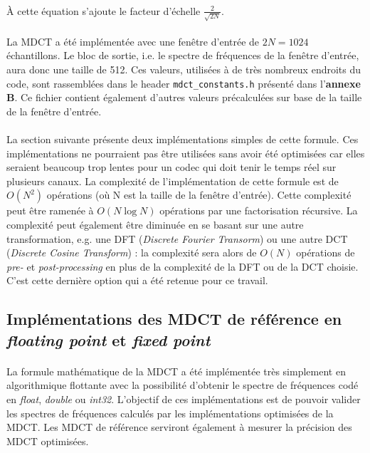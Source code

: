 \documentclass{article}
\begin{document}
    \paragraph{}
    À cette équation s'ajoute le facteur d'échelle $\frac{2}{\sqrt{2N}}$.

    \paragraph{}
    La MDCT a été implémentée avec une fenêtre d'entrée de $2N = 1024$ échantillons. Le bloc de sortie, i.e. le spectre de fréquences de la fenêtre d'entrée, aura donc une taille de 512. Ces valeurs, utilisées à de très nombreux endroits du code, sont rassemblées dans le header \texttt{mdct\_constants.h} présenté dans l'\textbf{annexe B}. Ce fichier contient également d'autres valeurs précalculées sur base de la taille de la fenêtre d'entrée.

    \paragraph{}
    La section suivante présente deux implémentations simples de cette formule. Ces implémentations ne pourraient pas être utilisées sans avoir été optimisées car elles seraient beaucoup trop lentes pour un codec qui doit tenir le temps réel sur plusieurs canaux. La complexité de l'implémentation de cette formule est de $O(N^2)$ opérations (où N est la taille de la fenêtre d'entrée). Cette complexité peut être ramenée à $O(N \log N)$ opérations par une factorisation récursive. La complexité peut également être diminuée en se basant sur une autre transformation, e.g. une DFT (\emph{Discrete Fourier Transorm}) ou une autre DCT (\emph{Discrete Cosine Transform}) : la complexité sera alors de $O(N)$ opérations de \emph{pre-} et \emph{post-processing} en plus de la complexité de la DFT ou de la DCT choisie\cite{wiki:MDCT}. C'est cette dernière option qui a été retenue pour ce travail.

    \subsection{Implémentations des MDCT de référence en \emph{floating point} et \emph{fixed point}}

    \paragraph{}
    La formule mathématique de la MDCT a été implémentée très simplement en algorithmique flottante avec la possibilité d'obtenir le spectre de fréquences codé en \emph{float}, \emph{double} ou \emph{int32}. L'objectif de ces implémentations est de pouvoir valider les spectres de fréquences calculés par les implémentations optimisées de la MDCT. Les MDCT de référence serviront également à mesurer la précision des MDCT optimisées.
\end{document}
